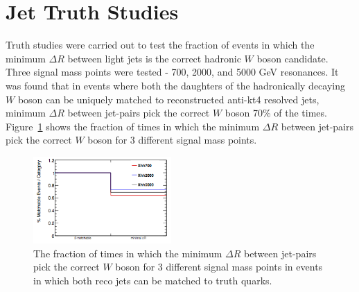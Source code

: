 \section{Jet Truth Studies}
\label{app:jetTruthStudies}
Truth studies were carried out to test the fraction of events in which the minimum $\Delta R$ between light jets is the correct hadronic $W$ boson candidate. Three signal mass points were tested - 700, 2000, and 5000 GeV resonances. It was found that in events where both the daughters of the hadronically decaying $W$ boson can be uniquely matched to reconstructed anti-kt4 resolved jets, minimum $\Delta R$  between jet-pairs pick the correct $W$ boson 70\% of the times. Figure~\ref{fig:minDeltaR_qq} shows the fraction of times in which the minimum $\Delta R$  between jet-pairs pick the correct $W$ boson for 3 different signal mass points. 

\begin{figure}[!h]
\begin{center}
\includegraphics*[width=0.47\textwidth] {figures/minDeltaR_qq.png}
\caption[The fraction of times in which the minimum $\Delta R$  between jet-pairs pick the correct $W$ boson for 3 different signal mass points. ]{ The fraction of times in which the minimum $\Delta R$  between jet-pairs pick the correct $W$ boson for 3 different signal mass points in events in which both reco jets can be matched to truth quarks. }
\label{fig:minDeltaR_qq}
\end{center}
\end{figure}